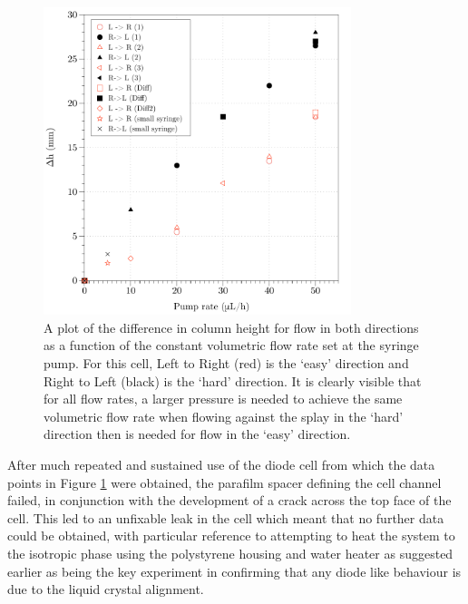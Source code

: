 \begin{figure}
\begin{center}
\includegraphics[width=0.8\textwidth]{Figures/Diode/first_diode/difference}
\end{center}
\caption[Difference in column heights as a function of flow rate for both directions (first diode behaviour)]{\label{fig:first_diode_main_graph}A plot of the difference in column height for flow in both directions as a function of the constant volumetric flow rate set at the syringe pump. For this cell, Left to Right (red) is the `easy' direction and Right to Left (black) is the `hard' direction. It is clearly visible that for all flow rates, a larger pressure is needed to achieve the same volumetric flow rate when flowing against the splay in the `hard' direction then is needed for flow in the `easy' direction.}
\end{figure}

After much repeated and sustained use of the diode cell from which the data points in Figure \ref{fig:first_diode_main_graph} were obtained, the parafilm spacer defining the cell channel failed, in conjunction with the development of a crack across the top face of the cell. This led to an unfixable leak in the cell which meant that no further data could be obtained, with particular reference to attempting to heat the system to the isotropic phase using the polystyrene housing and water heater as suggested earlier as being the key experiment in confirming that any diode like behaviour is due to the liquid crystal alignment.

